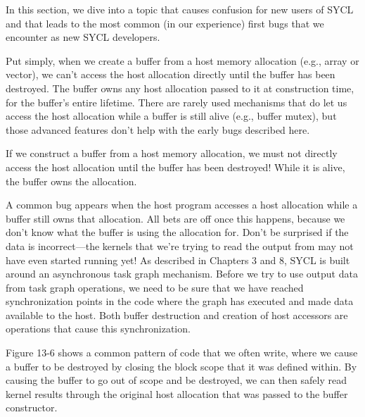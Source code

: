 In this section, we dive into a topic that causes confusion for new users of SYCL and that leads to the most common (in our experience) first bugs that we encounter as new SYCL developers.\par

Put simply, when we create a buffer from a host memory allocation (e.g., array or vector), we can’t access the host allocation directly until the buffer has been destroyed. The buffer owns any host allocation passed to it at construction time, for the buffer’s entire lifetime. There are rarely used mechanisms that do let us access the host allocation while a buffer is still alive (e.g., buffer mutex), but those advanced features don’t help with the early bugs described here.\par

\begin{tcolorbox}[colback=red!5!white,colframe=red!75!black]
If we construct a buffer from a host memory allocation, we must not directly access the host allocation until the buffer has been destroyed! While it is alive, the buffer owns the allocation.
\end{tcolorbox}

A common bug appears when the host program accesses a host allocation while a buffer still owns that allocation. All bets are off once this happens, because we don’t know what the buffer is using the allocation for. Don’t be surprised if the data is incorrect—the kernels that we’re trying to read the output from may not have even started running yet! As described in Chapters 3 and 8, SYCL is built around an asynchronous task graph mechanism. Before we try to use output data from task graph operations, we need to be sure that we have reached synchronization points in the code where the graph has executed and made data available to the host. Both buffer destruction and creation of host accessors are operations that cause this synchronization.\par

Figure 13-6 shows a common pattern of code that we often write, where we cause a buffer to be destroyed by closing the block scope that it was defined within. By causing the buffer to go out of scope and be destroyed, we can then safely read kernel results through the original host allocation that was passed to the buffer constructor.\par

